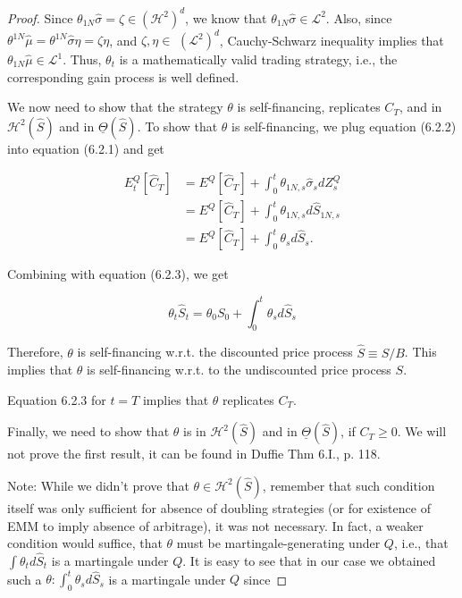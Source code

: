 \documentclass[\topdir/lecture\_notes.tex]{subfiles}
\begin{document}
\begin{proof}
Since $\theta_{1 N} \hat{\sigma}=\zeta \in\left(\mathcal{H}^{2}\right)^{d}$, we know that $\theta_{1 N} \hat{\sigma} \in \mathcal{L}^{2}$. Also, since $\theta^{1 N} \hat{\mu}=\theta^{1 N} \hat{\sigma} \eta=\zeta \eta$, and $\zeta, \eta \in$ $\left(\mathcal{L}^{2}\right)^{d}$, Cauchy-Schwarz inequality implies that $\theta_{1 N} \hat{\mu} \in \mathcal{L}^{1}$. Thus, $\theta_{t}$ is a mathematically valid trading strategy, i.e., the corresponding gain process is well defined.

We now need to show that the strategy $\theta$ is self-financing, replicates $C_{T}$, and in $\mathcal{H}^{2}(\hat{S})$ and in $\underline{\Theta}(\hat{S})$. To show that $\theta$ is self-financing, we plug equation (6.2.2) into equation (6.2.1) and get

\begin{equation}
\begin{aligned}
E_{t}^{Q}\left[\hat{C}_{T}\right] & =E^{Q}\left[\hat{C}_{T}\right]+\int_{0}^{t} \theta_{1 N, s} \hat{\sigma}_{s} d Z_{s}^{Q} \\
& =E^{Q}\left[\hat{C}_{T}\right]+\int_{0}^{t} \theta_{1 N, s} d \hat{S}_{1 N, s} \\
& =E^{Q}\left[\hat{C}_{T}\right]+\int_{0}^{t} \theta_{s} d \hat{S}_{s} .
\end{aligned}
\end{equation}

Combining with equation (6.2.3), we get

\begin{equation}
\theta_{t} \hat{S}_{t}=\theta_{0} S_{0}+\int_{0}^{t} \theta_{s} d \hat{S}_{s}
\end{equation}

Therefore, $\theta$ is self-financing w.r.t. the discounted price process $\hat{S} \equiv S / B$. This implies that $\theta$ is self-financing w.r.t. to the undiscounted price process $S$.

Equation 6.2.3 for $t=T$ implies that $\theta$ replicates $C_{T}$.

Finally, we need to show that $\theta$ is in $\mathcal{H}^{2}(\hat{S})$ and in $\underline{\Theta}(\hat{S})$, if $C_{T} \geq 0$. We will not prove the first result, it can be found in Duffie Thm 6.I., p. 118.

Note: While we didn't prove that $\theta \in \mathcal{H}^{2}(\hat{S})$, remember that such condition itself was only sufficient for absence of doubling strategies (or for existence of EMM to imply absence of arbitrage), it was not necessary. In fact, a weaker condition would suffice, that $\theta$ must be martingale-generating under $Q$, i.e., that $\int \theta_{t} d \hat{S}_{t}$ is a martingale under $Q$. It is easy to see that in our case we obtained such a $\theta: \int_{0}^{t} \theta_{s} d \hat{S}_{s}$ is a martingale under $Q$ since


\end{proof}
\end{document}
